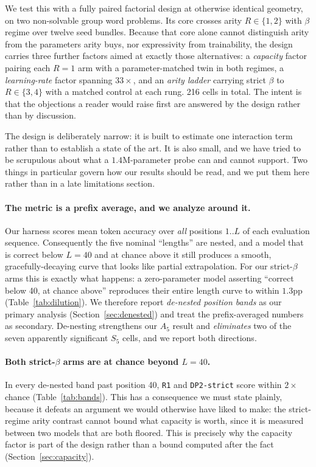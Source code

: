 \documentclass[10pt,twocolumn]{article}
\begin{document}
We test this with a fully paired factorial design at otherwise identical
geometry, on two non-solvable group word problems. Its core crosses arity
$R \in \{1,2\}$ with $\beta$ regime over twelve seed bundles. Because that
core alone cannot distinguish arity from the parameters arity buys, nor
expressivity from trainability, the design carries three further factors aimed at
exactly those alternatives: a \emph{capacity} factor pairing each $R{=}1$ arm
with a parameter-matched twin in both regimes, a \emph{learning-rate} factor
spanning $33\times$, and an \emph{arity ladder} carrying strict $\beta$ to
$R\in\{3,4\}$ with a matched control at each rung. 216 cells in total. The intent
is that the objections a reader would raise first are answered by the design
rather than by discussion.

The design is deliberately narrow: it is built to estimate one interaction term
rather than to establish a state of the art. It is also small, and we have tried
to be scrupulous about what a $1.4$M-parameter probe can and cannot
support. Two things in particular govern how our results should be read, and we
put them here rather than in a late limitations section.

\paragraph{The metric is a prefix average, and we analyze around it.}
Our harness scores mean token accuracy over \emph{all} positions $1..L$ of each
evaluation sequence. Consequently the five nominal ``lengths'' are nested, and a
model that is correct below $L=40$ and at chance above it still produces a
smooth, gracefully-decaying curve that looks like partial extrapolation. For our
strict-$\beta$ arms this is exactly what happens: a zero-parameter model
asserting ``correct below 40, at chance above'' reproduces their entire length
curve to within $1.3$pp (Table~\ref{tab:dilution}). We therefore report
\emph{de-nested position bands} as our primary analysis
(Section~\ref{sec:denested}) and treat the prefix-averaged numbers as secondary.
De-nesting strengthens our $A_5$ result and \emph{eliminates} two of the seven
apparently significant $S_5$ cells, and we report both directions.

\paragraph{Both strict-$\beta$ arms are at chance beyond $L=40$.}
In every de-nested band past position 40, \texttt{R1} and \texttt{DP2-strict}
score within $2\times$ chance (Table~\ref{tab:bands}). This has a consequence we
must state plainly, because it defeats an argument we would otherwise have
liked to make: the strict-regime arity contrast cannot bound what capacity is
worth, since it is measured between two models that are both floored. This is
precisely why the capacity factor is part of the design rather than a bound
computed after the fact (Section~\ref{sec:capacity}).
\end{document}
